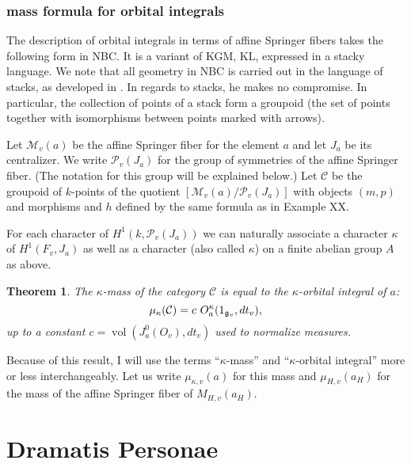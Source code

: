 \documentclass[brochure,english,12pt]{bourbaki}
\newtheorem{example}[equation]{Example}
\newtheorem{theorem}[equation]{Theorem}
\def\op#1{{\operatorname{#1}}}
\def\g{\frak{g}}
\def\C{{\mathcal C}}
\def\M{{\mathcal M}}
\def\P{{\mathcal P}}
\begin{document}


\subsubsection{mass formula for orbital integrals}

The description of orbital integrals in terms of affine Springer
fibers takes the following form in NBC.  It is a variant of KGM, KL,
expressed in a stacky language.  We note that all geometry in NBC is
carried out in the language of stacks, as developed in
\cite{Laumon-MB}.  In regards to stacks, he makes no compromise.  In
particular, the collection of points of a stack form a groupoid (the
set of points together with isomorphisms between points marked with
arrows).

Let $\M_v(a)$ be the affine Springer fiber for the element $a$ and let
$J_a$ be its centralizer.  We write $\P_v(J_a)$ for the group of
symmetries of the affine Springer fiber.  (The notation for this group
will be explained below.)  Let $\C$ be the groupoid of $k$-points of
the quotient $[\M_v(a)/\P_v(J_a)]$ with objects $(m,p)$ and morphisms
and $h$ defined by the same formula as in Example XX.

For each character of $H^1(k,\P_v(J_a))$ we can naturally associate a
character $\kappa$ of $H^1(F_v,J_a)$ as well as a character (also
called $\kappa$) on a finite abelian group $A$ as above.

\begin{theorem}
The $\kappa$-mass of the category $\C$ is equal to the
$\kappa$-orbital integral of $a$:
\[
\mu_\kappa(\C) = c\,\, O^\kappa_a(1_{\g_v},dt_v),
\]
up to a constant $c=\op{vol}(J^0_a(O_v),dt_v)$ used to normalize measures.
\end{theorem}

Because of this result, I will use the terms ``$\kappa$-mass'' and
``$\kappa$-orbital integral'' more or less interchangeably.  Let us
write $\mu_{\kappa,v}(a)$ for this mass and $\mu_{H,v}(a_H)$ for the
mass of the affine Springer fiber of $M_{H,v}(a_H)$.

\section{Dramatis Personae}
\end{document}
